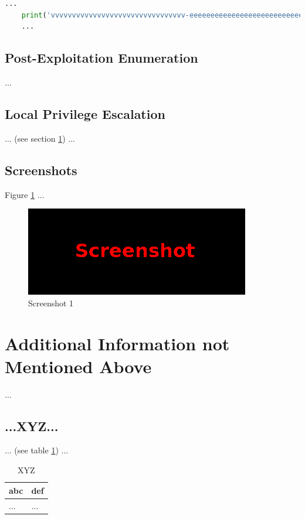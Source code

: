 \begin{lstlisting}[language=Python,caption={Proof of Concept}, label={lst:sec3-gain}]
    ...
    print('vvvvvvvvvvvvvvvvvvvvvvvvvvvvvvvv-eeeeeeeeeeeeeeeeeeeeeeeeeeeeeeeeeeeeeeeeeee-looooooooooooooooooooooong-striiiiiiiiiiiiiing')
    ...
\end{lstlisting}
%
%
%
\subsection{Post-Exploitation Enumeration}\label{sec:sec3-enum2}
%
...
%
%
%
\subsection{Local Privilege Escalation}\label{sec:sec3-privescal}
%
... (see section \ref{sec:last}) ...
%
%
%
\subsection{Screenshots}\label{sec:sec3-screen1}
%
Figure \ref{fig:sec3-screen1} ...

\begin{figure}[H]
    \centering
    \includegraphics[width=\textwidth]{img/assignment1/screen1.png}
    \caption{Screenshot 1}\label{fig:sec3-screen1}
\end{figure}
%
%
%
\section{Additional Information not Mentioned Above}\label{sec:last}
%
...
%
%
%
\subsection{...XYZ...}\label{sec:last-xyz}
%
... (see table \ref{tbl:last-xyz}) ...

\begin{table}[H]
    \begin{tabularx}{\textwidth}{l|l}
        \textbf{abc} & \textbf{def} \\
        \hline
        ... & ...\\
    \end{tabularx}
    \caption{XYZ\label{tbl:last-xyz}}
\end{table}
%
%
%